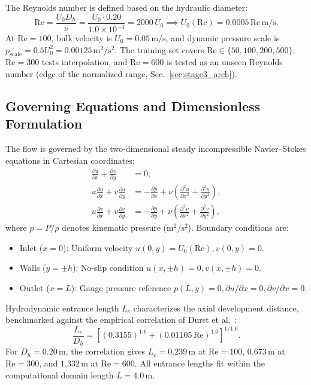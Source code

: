 \documentclass[11pt,a4paper]{article}
\begin{document}
The Reynolds number is defined based on the hydraulic diameter:
\begin{equation}
\mathrm{Re} = \frac{U_0 D_h}{\nu} = \frac{U_0 \cdot 0.20}{1.0\times 10^{-4}} = 2000\,U_0 \implies U_0(\mathrm{Re}) = 0.0005\,\mathrm{Re}\,\text{m/s}.
\end{equation}
At $\mathrm{Re}=100$, bulk velocity is $U_0 = 0.05\,\text{m/s}$, and dynamic pressure scale is $p_{\mathrm{scale}} = 0.5 U_0^2 = 0.00125\,\text{m}^2/\text{s}^2$. The training set covers $\mathrm{Re} \in \{50, 100, 200, 500\}$; $\mathrm{Re}=300$ tests interpolation, and $\mathrm{Re}=600$ is tested as an unseen Reynolds number (edge of the normalized range, Sec.~\ref{sec:stage3_arch}).

\subsection{Governing Equations and Dimensionless Formulation}
The flow is governed by the two-dimensional steady incompressible Navier--Stokes equations in Cartesian coordinates:
\begin{align}
\frac{\partial u}{\partial x} + \frac{\partial v}{\partial y} &= 0, \\
u \frac{\partial u}{\partial x} + v \frac{\partial u}{\partial y} &= -\frac{\partial p}{\partial x} + \nu \left(\frac{\partial^2 u}{\partial x^2} + \frac{\partial^2 u}{\partial y^2}\right), \\
u \frac{\partial v}{\partial x} + v \frac{\partial v}{\partial y} &= -\frac{\partial p}{\partial y} + \nu \left(\frac{\partial^2 v}{\partial x^2} + \frac{\partial^2 v}{\partial y^2}\right),
\end{align}
where $p = P/\rho$ denotes kinematic pressure ($\text{m}^2/\text{s}^2$). Boundary conditions are:
\begin{itemize}[leftmargin=1.5em]
    \item Inlet ($x=0$): Uniform velocity $u(0, y) = U_0(\mathrm{Re}), v(0, y) = 0$.
    \item Walls ($y = \pm h$): No-slip condition $u(x, \pm h) = 0, v(x, \pm h) = 0$.
    \item Outlet ($x=L$): Gauge pressure reference $p(L, y) = 0, \partial u/\partial x = 0, \partial v/\partial x = 0$.
\end{itemize}
Hydrodynamic entrance length $L_e$ characterizes the axial development distance, benchmarked against the empirical correlation of Durst et al.~\cite[Eq.~(2b), p.~8]{ray2017}:
\begin{equation}
\frac{L_e}{D_h} = \left[(0.3155)^{1.6} + (0.01105\,\mathrm{Re})^{1.6}\right]^{1/1.6}.
\end{equation}
For $D_h = 0.20\,\text{m}$, the correlation gives $L_e = 0.239\,\text{m}$ at $\mathrm{Re}=100$, $0.673\,\text{m}$ at $\mathrm{Re}=300$, and $1.332\,\text{m}$ at $\mathrm{Re}=600$. All entrance lengths fit within the computational domain length $L = 4.0\,\text{m}$.
\end{document}
